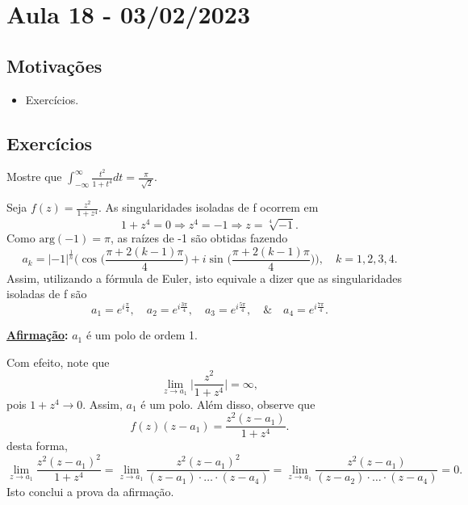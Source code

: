 \documentclass[ComplexAnalysis/complex.tex]{subfiles}
\begin{document}
\section{Aula 18 - 03/02/2023}
\subsection{Motivações}
\begin{itemize}
	\item Exercícios.
\end{itemize}
\subsection{Exercícios}
\begin{exer*}
	Mostre que \(\int_{-\infty}^{\infty}\frac{t^{2}}{1+t^{4}}dt = \frac{\pi }{\sqrt[]{2}}\).

	Seja \(f(z) = \frac{z^{2}}{1+z^{4}}.\) As singularidades isoladas de f ocorrem em
	\[
		1 + z^{4} = 0 \Rightarrow z^{4} = -1 \Rightarrow z = \sqrt[4]{-1}.
	\]
	Como \(\mathrm{arg}(-1) = \pi \), as raízes de -1 são obtidas fazendo
	\[
		a_{k} = |-1|^{\frac{1}{n}}\biggl(\cos^{}{\biggl(\frac{\pi + 2(k-1)\pi }{4}\biggr)} + i\sin^{}{\biggl(\frac{\pi + 2(k-1)\pi }{4}\biggr)}\biggr),\quad k=1, 2, 3, 4.
	\]
	Assim, utilizando a fórmula de Euler, isto equivale a dizer que as singularidades isoladas de f são
	\[
		a_{1} = e^{i \frac{\pi }{4}},\quad a_{2} = e^{i \frac{3\pi }{4}},\quad a_3=e^{i \frac{5\pi }{4}},\quad\&\quad a_{4}=e^{i \frac{7\pi }{4}}.
	\]

	\textbf{\underline{Afirmação}:} \(a_{1}\) é um polo de ordem 1.

	Com efeito, note que
	\[
		\lim_{z\to a_{1}}\biggl\vert \frac{z^{2}}{1+z^{4}} \biggr\vert = \infty,
	\]
	pois \(1 + z^{4}\to 0\). Assim, \(a_{1}\) é um polo. Além disso, observe que
	\[
		f(z)(z-a_1) = \frac{z^{2}(z-a_{1})}{1 + z^{4}}.
	\]
	desta forma,
	\[
		\lim_{z\to a_{1}}\frac{z^{2}(z-a_{1})^{2}}{1+z^{4}}=\lim_{z\to a_{1}}\frac{z^{2}(z-a_{1})^{2}}{(z-a_{1})\cdot \dotsc \cdot (z-a_{4})} = \lim_{z\to a_{1}}\frac{z^{2}(z-a_{1})}{(z-a_{2})\cdot \dotsc \cdot (z-a_{4})} = 0.
	\]
	Isto conclui a prova da afirmação.


\end{exer*}
\end{document}
